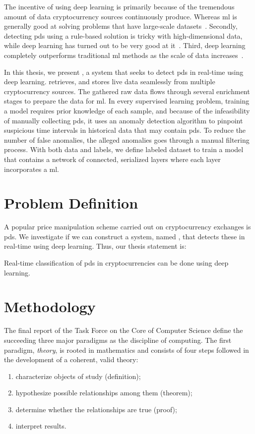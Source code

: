 The incentive of using deep learning is primarily because of the tremendous amount of data cryptocurrency sources continuously produce. Whereas \ac{ml} is generally good at solving problems that have large-scale datasets~\cite{aws}. Secondly, detecting \acp{pd} using a rule-based solution is tricky with high-dimensional data, while deep learning has turned out to be very good at it~\cite{lecun2015deep}. Third, deep learning completely outperforms traditional \ac{ml} methods as the scale of data increases~\cite{dl_intrusion, peng2015multi}. 

In this thesis, we present \project, a system that seeks to detect \acp{pd} in real-time using deep learning. \project retrieves, and stores live data seamlessly from multiple cryptocurrency sources. The gathered raw data flows through several enrichment stages to prepare the data for \ac{ml}. In every supervised learning problem, training a model requires prior knowledge of each sample, and because of the infeasibility of manually collecting \acp{pd}, it uses an anomaly detection algorithm to pinpoint suspicious time intervals in historical data that may contain \acp{pd}. To reduce the number of false anomalies, the alleged anomalies goes through a manual filtering process. With both data and labels, we define labeled dataset to train a model that contains a network of connected, serialized layers where each layer incorporates a \ac{ml}.

\section{Problem Definition}\label{sec:problem_definition}
A popular price manipulation scheme carried out on cryptocurrency exchanges is \acp{pd}. We investigate if we can construct a system, named \project, that detects these in real-time using deep learning. Thus, our thesis statement is:

\begin{displayquote}
    \begin{em}
    Real-time classification of \acfp{pd} in cryptocurrencies can be done using deep learning.
    \end{em}
\end{displayquote}


\section{Methodology}\label{sec:methodology}
The final report of the Task Force on the Core of Computer Science\cite{computing_as_a_discipline} define the succeeding three major paradigms as the discipline of computing. The first paradigm, \emph{theory}, is rooted in mathematics and consists of four steps followed in the development of a coherent, valid theory: 
\begin{enumerate}
    \item characterize objects of study (definition);
    \item hypothesize possible relationships among them (theorem);
    \item determine whether the relationships are true (proof); 
    \item interpret results.
\end{enumerate}

